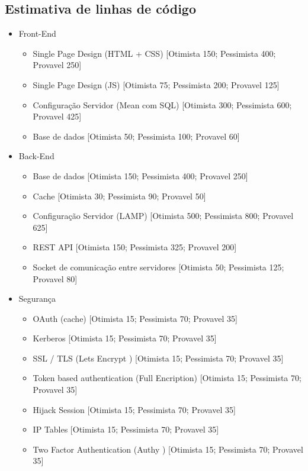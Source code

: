 \documentclass[a4paper]{report}
\begin{document}
\subsection{Estimativa de linhas de código}
\begin{itemize}
\item Front-End
    \begin{itemize}
    \item Single Page Design (HTML + CSS) [Otimista 150; Pessimista 400; Provavel 250]
    \item Single Page Design (JS) [Otimista 75; Pessimista 200; Provavel 125]
    \item Configuração Servidor (Mean com SQL) [Otimista 300; Pessimista 600; Provavel 425]
    \item Base de dados [Otimista 50; Pessimista 100; Provavel 60]
    \end{itemize}
\item Back-End
    \begin{itemize}
    \item Base de dados [Otimista 150; Pessimista 400; Provavel 250]
    \item Cache [Otimista 30; Pessimista 90; Provavel 50]
    \item Configuração Servidor (LAMP) [Otimista 500; Pessimista 800; Provavel 625]
    \item REST API [Otimista 150; Pessimista 325; Provavel 200]
    \item Socket de comunicação entre servidores [Otimista 50; Pessimista 125; Provavel 80]
    \end{itemize}
\item Segurança
    \begin{itemize}
    \item OAuth (cache) [Otimista 15; Pessimista 70; Provavel 35]
    \item Kerberos [Otimista 15; Pessimista 70; Provavel 35]
    \item SSL / TLS (Lets Encrypt \cite{letsencrypt}) [Otimista 15; Pessimista 70; Provavel 35]
    \item Token based authentication (Full Encription) [Otimista 15; Pessimista 70; Provavel 35]
    \item Hijack Session [Otimista 15; Pessimista 70; Provavel 35]
    \item IP Tables [Otimista 15; Pessimista 70; Provavel 35]
    \item Two Factor Authentication (Authy \cite{authy}) [Otimista 15; Pessimista 70; Provavel 35]

\end{itemize}
\end{itemize}
\end{document}
